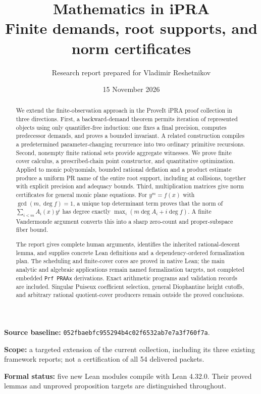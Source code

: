 \documentclass[11pt,oneside]{article}
\title{\textbf{Mathematics in iPRA}\\[0.55em]
\large Finite demands, root supports, and norm certificates}
\author{Research report prepared for Vladimir Reshetnikov}
\date{15 November 2026}
\theoremstyle{definition}
\theoremstyle{remark}
\begin{document}
\maketitle
\thispagestyle{empty}
\begin{abstract}
We extend the finite-observation approach in the ProveIt iPRA proof
collection in three directions. First, a backward-demand theorem permits
iteration of represented objects using only quantifier-free induction:
one fixes a final precision, computes predecessor demands, and proves a
bounded invariant. A related construction compiles a predetermined
parameter-changing recurrence into two ordinary primitive recursions.
Second, nonempty finite rational sets provide aggregate witnesses.
We prove finite cover calculus, a prescribed-chain point constructor,
and quantitative optimization. Applied to monic polynomials, bounded
rational deflation and a product estimate produce a uniform PR name of
the entire root support, including at collisions, together with explicit
precision and adequacy bounds. Third, multiplication matrices give norm
certificates for general monic plane equations. For
$y^m=f(x)$ with $\gcd(m,\deg f)=1$, a unique top determinant term proves
that the norm of $\sum_{i<m}A_i(x)y^i$ has degree exactly
$\max_i(m\deg A_i+i\deg f)$. A finite Vandermonde argument converts
this into a sharp zero-count and proper-subspace fiber bound.

The report gives complete human arguments, identifies the inherited
rational-descent lemma, and supplies concrete Lean definitions and a
dependency-ordered formalization plan. The scheduling and finite-cover
cores are proved in native Lean; the main analytic and algebraic
applications remain named formalization targets, not completed embedded
\texttt{Prf PRAAx} derivations. Exact arithmetic programs and validation
records are included. Singular Puiseux coefficient selection, general
Diophantine height cutoffs, and arbitrary rational quotient-cover
producers remain outside the proved conclusions.
\end{abstract}

\vspace{0.5em}
\noindent\textbf{Source baseline:}
\texttt{052fbaebfc955294b4c02f6532ab7e7a3f760f7a}.\par
\noindent\textbf{Scope:} a targeted extension of the current collection,
including its three existing framework reports; not a certification of
all 54 delivered packets.\par
\noindent\textbf{Formal status:} five new Lean modules compile with
Lean 4.32.0. Their proved lemmas and unproved proposition targets are
distinguished throughout.
\end{document}

